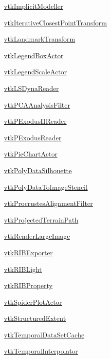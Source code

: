 \begin{DoxyItemize}
\item \hyperlink{vtkhybrid_vtkimplicitmodeller}{vtk\-Implicit\-Modeller}  
\item \hyperlink{vtkhybrid_vtkiterativeclosestpointtransform}{vtk\-Iterative\-Closest\-Point\-Transform}  
\item \hyperlink{vtkhybrid_vtklandmarktransform}{vtk\-Landmark\-Transform}  
\item \hyperlink{vtkhybrid_vtklegendboxactor}{vtk\-Legend\-Box\-Actor}  
\item \hyperlink{vtkhybrid_vtklegendscaleactor}{vtk\-Legend\-Scale\-Actor}  
\item \hyperlink{vtkhybrid_vtklsdynareader}{vtk\-L\-S\-Dyna\-Reader}  
\item \hyperlink{vtkhybrid_vtkpcaanalysisfilter}{vtk\-P\-C\-A\-Analysis\-Filter}  
\item \hyperlink{vtkhybrid_vtkpexodusiireader}{vtk\-P\-Exodus\-I\-I\-Reader}  
\item \hyperlink{vtkhybrid_vtkpexodusreader}{vtk\-P\-Exodus\-Reader}  
\item \hyperlink{vtkhybrid_vtkpiechartactor}{vtk\-Pie\-Chart\-Actor}  
\item \hyperlink{vtkhybrid_vtkpolydatasilhouette}{vtk\-Poly\-Data\-Silhouette}  
\item \hyperlink{vtkhybrid_vtkpolydatatoimagestencil}{vtk\-Poly\-Data\-To\-Image\-Stencil}  
\item \hyperlink{vtkhybrid_vtkprocrustesalignmentfilter}{vtk\-Procrustes\-Alignment\-Filter}  
\item \hyperlink{vtkhybrid_vtkprojectedterrainpath}{vtk\-Projected\-Terrain\-Path}  
\item \hyperlink{vtkhybrid_vtkrenderlargeimage}{vtk\-Render\-Large\-Image}  
\item \hyperlink{vtkhybrid_vtkribexporter}{vtk\-R\-I\-B\-Exporter}  
\item \hyperlink{vtkhybrid_vtkriblight}{vtk\-R\-I\-B\-Light}  
\item \hyperlink{vtkhybrid_vtkribproperty}{vtk\-R\-I\-B\-Property}  
\item \hyperlink{vtkhybrid_vtkspiderplotactor}{vtk\-Spider\-Plot\-Actor}  
\item \hyperlink{vtkhybrid_vtkstructuredextent}{vtk\-Structured\-Extent}  
\item \hyperlink{vtkhybrid_vtktemporaldatasetcache}{vtk\-Temporal\-Data\-Set\-Cache}  
\item \hyperlink{vtkhybrid_vtktemporalinterpolator}{vtk\-Temporal\-Interpolator}  

\end{DoxyItemize}
